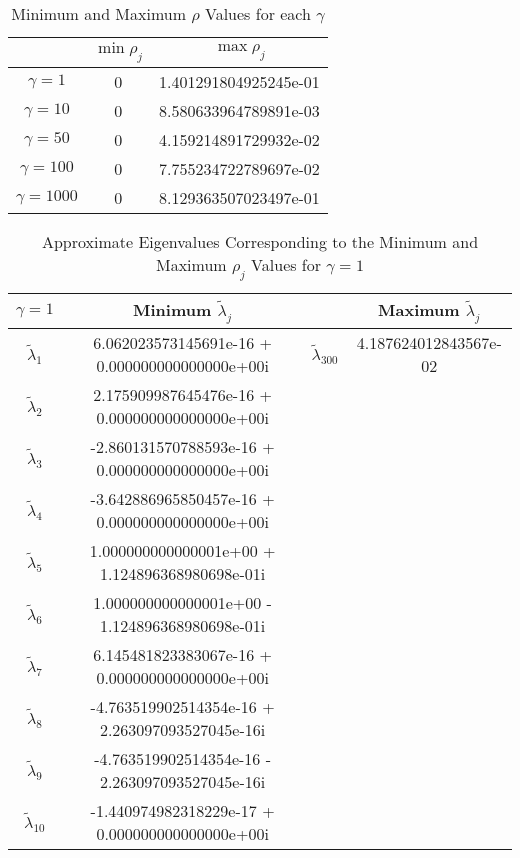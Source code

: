 \documentclass[12pt]{article}
\begin{document}
\begin{table}[H]
\centering
\renewcommand{\arraystretch}{1.5}
\begin{tabular}{| c || c | c |}
\hline
& $\min \rho_j$ & $\max \rho_j$ \\
\hline
\hline
$\gamma = 1$ & 0  &  1.401291804925245e-01 \\
$\gamma = 10$ & 0  &  8.580633964789891e-03 \\
$\gamma = 50$ & 0  &  4.159214891729932e-02 \\
$\gamma = 100$ & 0 & 7.755234722789697e-02  \\
$\gamma = 1000$ & 0  & 8.129363507023497e-01  \\
\hline
\end{tabular}
\caption{Minimum and Maximum $\rho$ Values for each $\gamma$}
\end{table} 


\begin{table}[H]
\centering
\renewcommand{\arraystretch}{1.5}
\begin{small}
\begin{tabular}{| c | c || c | c |}
\hline
$\gamma = 1$ &  \textbf{Minimum $\tilde{\lambda}_j$} &   &  \textbf{Maximum $\tilde{\lambda}_j$} \\
\hline 
\hline
$\tilde{\lambda}_1$ & 6.062023573145691e-16 + 0.000000000000000e+00i  & $\tilde{\lambda}_{300}$ &  4.187624012843567e-02 \\
$\tilde{\lambda}_2$ & 2.175909987645476e-16 + 0.000000000000000e+00i  &  &   \\
$\tilde{\lambda}_3$ & -2.860131570788593e-16 + 0.000000000000000e+00i  &  &   \\
$\tilde{\lambda}_4$ & -3.642886965850457e-16 + 0.000000000000000e+00i  &  &   \\
$\tilde{\lambda}_5$ & 1.000000000000001e+00 + 1.124896368980698e-01i  &  &   \\
$\tilde{\lambda}_6$ & 1.000000000000001e+00 - 1.124896368980698e-01i  &  &   \\
$\tilde{\lambda}_7$ & 6.145481823383067e-16 + 0.000000000000000e+00i  &  &   \\
$\tilde{\lambda}_8$ &  -4.763519902514354e-16 + 2.263097093527045e-16i  &  &   \\
$\tilde{\lambda}_9$ & -4.763519902514354e-16 - 2.263097093527045e-16i  &  &   \\
$\tilde{\lambda}_{10}$ & -1.440974982318229e-17 + 0.000000000000000e+00i  &  &   \\
\hline
\end{tabular}
\end{small}
\caption{Approximate Eigenvalues Corresponding to the Minimum and Maximum $\rho_j$ Values for $\gamma = 1$}
\end{table} 
\end{document}
